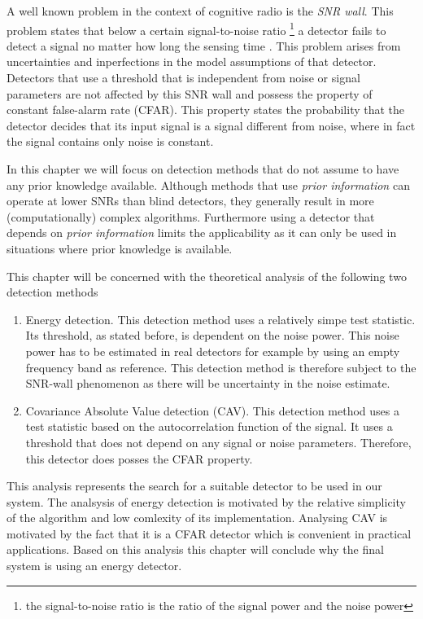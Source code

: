 \documentclass[a4paper, openany, oneside]{memoir}
\begin{document}
A well known problem in the context of cognitive radio is the \emph{SNR wall}. This problem states that below a certain signal-to-noise ratio \footnote{the signal-to-noise ratio is the ratio of the signal power and the noise power} a detector fails to detect a signal no matter how long the sensing time \cite{sahai2009spectrum}. This problem arises from uncertainties and inperfections in the model assumptions of that detector. Detectors that use a threshold that is independent from noise or signal parameters are not affected by this SNR wall\cite{axell2012spectrum} and possess the property of constant false-alarm rate (CFAR). This property states the probability that the detector decides that its input signal is a signal different from noise, where in fact the signal contains only noise is constant. 

In this chapter we will focus on detection methods that do not assume to have any prior knowledge available. Although methods that use \emph{prior information} can operate at lower SNRs than blind detectors, they generally result in more (computationally) complex algorithms. Furthermore using a detector that depends on \emph{prior information} limits the applicability as it can only be used in situations where prior knowledge is available.

This chapter will be concerned with the theoretical analysis of the following two detection methods

\begin{enumerate}
	\item Energy detection. This detection method uses a relatively simpe test statistic. Its threshold, as stated before, is dependent on 
	the noise power. This noise power has to be estimated in real detectors for example by using an empty frequency band as reference. This detection method is therefore subject to the SNR-wall phenomenon as there will be uncertainty in the noise estimate.
	\item Covariance Absolute Value detection (CAV). This detection method uses a test statistic based on the autocorrelation function of 
	the signal. It uses a threshold that does not depend on any signal or noise parameters. Therefore, this detector does posses the CFAR
	property.
\end{enumerate}

This analysis represents the search for a suitable detector to be used in our system.  The analsysis of energy detection is motivated by the relative simplicity of the algorithm and low comlexity of its implementation. Analysing CAV is motivated by the fact that it is a CFAR detector which is convenient in practical applications\cite{axell2012spectrum}.  Based on this analysis this chapter will conclude why the final system is using an energy detector. 
\end{document}
